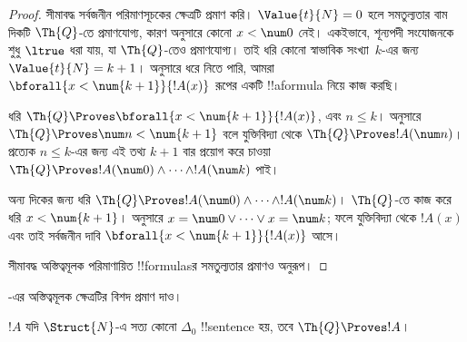 \documentclass[../../../include/open-logic-section]{subfiles}
\begin{document}
\begin{proof}
    সীমাবদ্ধ সর্বজনীন পরিমাণসূচকের ক্ষেত্রটি প্রমাণ করি।
    $\Value{t}{N} = 0$ হলে সমতুল্যতার বাম দিকটি $\Th{Q}$-তে প্রমাণযোগ্য,
    কারণ  অনুসারে কোনো
    $x<\num 0$ নেই। একইভাবে, শূন্যপদী সংযোজনকে শুধু $\ltrue$ ধরা যায়,
    যা $\Th{Q}$-তেও প্রমাণযোগ্য।
    তাই ধরি কোনো স্বাভাবিক সংখ্যা~$k$-এর জন্য $\Value{t}{N} = k+1$।
     অনুসারে ধরে নিতে পারি, আমরা
    $\bforall{x<\num{k+1}}{!A(x)}$ রূপের একটি !!a{formula} নিয়ে কাজ করছি।

    ধরি $\Th{Q} \Proves \bforall{x<\num{k+1}}{!A(x)}$, এবং $n \leq k$।
     অনুসারে
    $\Th{Q} \Proves \num n < \num{k+1}$ বলে যুক্তিবিদ্যা থেকে
    $\Th{Q} \Proves !A(\num n)$। প্রত্যেক $n \leq k$-এর জন্য এই তথ্য
    $k+1$ বার প্রয়োগ করে চাওয়া
    $\Th{Q} \Proves !A(\num 0) \land \dots \land !A(\num k)$ পাই।

    অন্য দিকের জন্য ধরি
    $\Th{Q} \Proves !A(\num 0) \land \dots \land !A(\num k)$।
    $\Th{Q}$-তে কাজ করে ধরি $x < \num{k+1}$।
     অনুসারে
    $x = \num 0 \lor \dots \lor x = \num k$; ফলে যুক্তিবিদ্যা থেকে
    $!A(x)$ এবং তাই সর্বজনীন দাবি
    $\bforall{x<\num{k+1}}{!A(x)}$ আসে।

    সীমাবদ্ধ অস্তিত্বমূলক পরিমাণায়িত !!{formula}sর সমতুল্যতার প্রমাণও
    অনুরূপ।
\end{proof}

\begin{prob}
-এর অস্তিত্বমূলক ক্ষেত্রটির বিশদ প্রমাণ দাও।
\end{prob}

\begin{lem}
$!A$ যদি $\Struct{N}$-এ সত্য কোনো $\Delta_0$ !!{sentence} হয়, তবে
$\Th{Q} \Proves !A$।
\end{lem}
\end{document}
